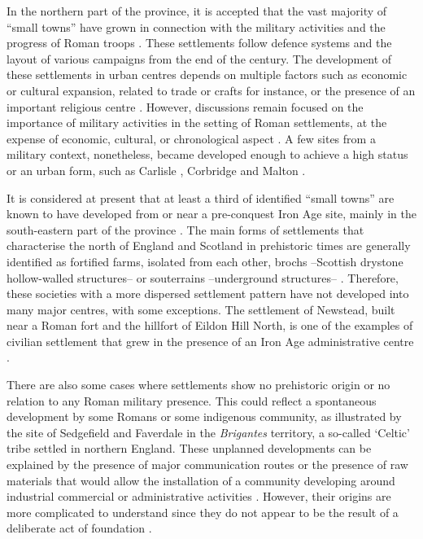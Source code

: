 
In the northern part of the province, it is accepted that the vast majority of “small towns” have grown in connection with the military activities and the progress of Roman troops \parencite[9]{Burnham_1990}. 
These settlements follow defence systems and the layout of various campaigns from the end of the  century\AD. The development of these settlements in urban centres depends on multiple factors such as economic or cultural expansion, related to trade or crafts for instance, or the presence of an important religious centre \parencites[9]{Burnham_1990}[5--6]{Frere_1975}. However, discussions remain focused on the importance of military activities in the setting of Roman settlements, at the expense of economic, cultural, or chronological aspect \parencite[for this debate, see][7--8]{Burnham_1990}. 
A few sites from a military context, nonetheless, became developed enough to achieve a high status or an urban form, such as Carlisle \parencite{McCarthy_2002}, Corbridge \parencites{Bishop_1988}{Hodgson_2008} and Malton \parencites{Wenham_1974}{Wilson_2006}.

It is considered at present that at least a third of identified “small towns” are known to have developed from or near a pre-conquest Iron Age site, mainly in the south-eastern part of the province \parencite[20]{Wacher_1995}. The main forms of settlements that characterise the north of England and Scotland in prehistoric times are generally identified as fortified farms, isolated from each other, brochs –Scottish drystone hollow-walled structures– or souterrains –underground structures– \parencite[61]{Jones_1990}. Therefore, these societies with a more dispersed settlement pattern have not developed into many major centres, with some exceptions. The settlement of Newstead, built near a Roman fort and the hillfort of Eildon Hill North, is one of the examples of civilian settlement that grew in the presence of an Iron Age administrative centre \parencite{Hunter_2012}.

There are also some cases where settlements show no prehistoric origin or no relation to any Roman military presence. This could reflect a spontaneous development by some Romans or some indigenous community, as illustrated by the site of Sedgefield \parencite{Durham_2010} and Faverdale \parencite{Proctor_2012} in the \emph{Brigantes} territory, a so-called ‘Celtic’ tribe settled in northern England. These unplanned developments can be explained by the presence of major communication routes or the presence of raw materials that would allow the installation of a community developing around industrial commercial or administrative activities \parencite[5--6]{Frere_1975}. However, their origins are more complicated to understand since they do not appear to be the result of a deliberate act of foundation \parencite[55]{Jones_1991}.

